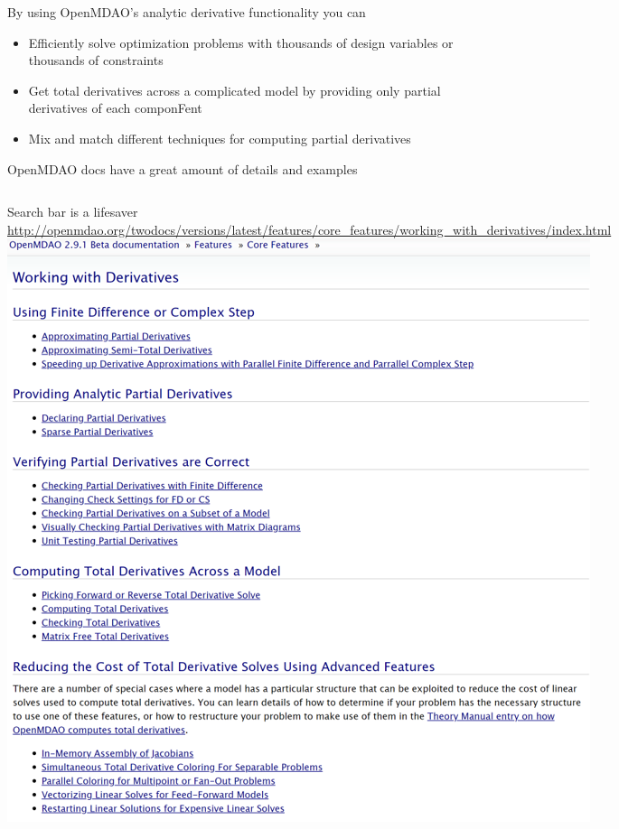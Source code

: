 \documentclass[aspectratio=169, usenames, dvipsnames, 14pt]{beamer}
\begin{document}
\begin{frame}{By using OpenMDAO's analytic derivative functionality you can}
	\begin{itemize}
		\item Efficiently solve optimization problems with thousands of design variables or thousands of constraints
		\item Get total derivatives across a complicated model by providing only partial derivatives of each componFent
		\item Mix and match different techniques for computing partial derivatives
	\end{itemize}
\end{frame}

\begin{frame}{OpenMDAO docs have a great amount of details and examples}

	\begin{columns}
			Search bar is a lifesaver
			\newline \newline \newline \newline \url{http://openmdao.org/twodocs/versions/latest/features/core_features/working_with_derivatives/index.html}
			\includegraphics[scale=.37]{images/slide_24_derivatives.png}
	\end{columns}

\end{frame}
\end{document}
